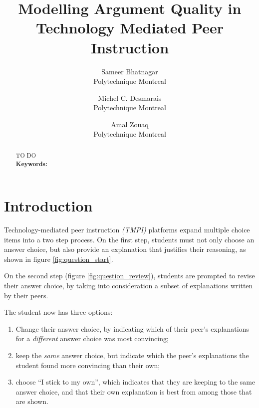 \documentclass[notitlepage,12pt]{jedm}
\begin{document}
	
	\title{Modelling Argument Quality in Technology Mediated Peer Instruction}
	\date{} %
	
	\author{
		{\large Sameer Bhatnagar}
		\\Polytechnique Montreal
	 	\and 
	 	{\large Michel C. Desmarais}
	 	\\Polytechnique Montreal
	 	\and 
	 	{\large Amal Zouaq}
 		\\Polytechnique Montreal
 }

	
	\maketitle
	
	\begin{abstract}
		TO DO
		\\ %
		
		{\parindent0pt
			\textbf{Keywords:} 
		}
	\end{abstract}

\section{Introduction}
Technology-mediated peer instruction \textit{(TMPI)} platforms 
\cite{charles_harnessing_2019}\cite{univeristy_of_british_columbia_ubc/ubcpi_2019}
expand multiple choice items into a two step process.
On the first step, students must not only choose an answer choice, but also 
provide an explanation that justifies their reasoning, as shown in figure 
\ref{fig:question_start}.

On the second step (figure \ref{fig:question_review}), students are prompted to 
revise 
their answer choice, by taking into consideration a subset of explanations 
written by their peers.

The student now has three options:
\begin{enumerate}
	\item Change their answer choice, by indicating which of their peer's 
	explanations for a \textit{different} answer choice was most convincing;
	\item keep the \textit{same} answer choice, but indicate which the peer's 
	explanations the student found more convincing than their own;
	\item choose ``I stick to my own'', which indicates that they are keeping 
	to the same answer choice, and that their own explanation is best from 
	among those that are shown.
\end{enumerate}
\end{document}
